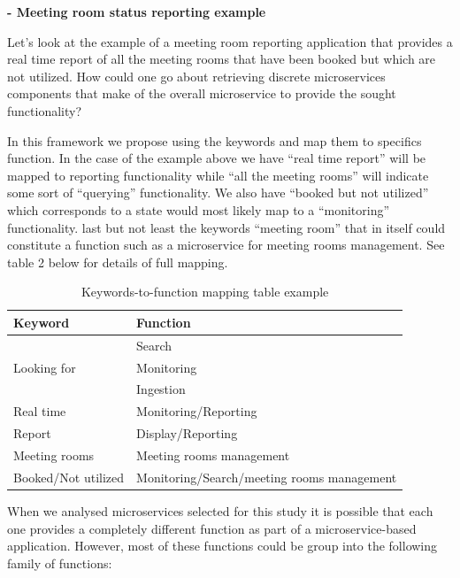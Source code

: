\documentclass{article}
\begin{document}
\textbf{- Meeting room status reporting example}

Let's look at the example of a meeting room reporting application that provides a real time report of all the meeting rooms that have been booked but which are not utilized. How could one go about retrieving discrete microservices components that make of the overall microservice to provide the sought functionality?

In this framework we propose using the keywords and map them to specifics function. In the case of the example above we have “real time report” will be mapped to reporting functionality while “all the meeting rooms” will indicate some sort of “querying” functionality. We also have “booked but not utilized” which corresponds to a state would most likely map to a “monitoring” functionality. last but not least the keywords “meeting room” that in itself could constitute a function such as a microservice for meeting rooms management. See table 2 below for details of full mapping.


\begin{table}[h!]
  \begin{center}
  \small
    \begin{tabular}{|l|l|} %
    \hline
    \textbf{Keyword} & \textbf{Function}\\
    \hline
      \multirow{3}{*}{Looking for} & Search\\
      & Monitoring\\ 
      & Ingestion\\
      \hline
      Real time & Monitoring/Reporting\\
      \hline
      Report & Display/Reporting\\
      \hline
      Meeting rooms & Meeting rooms management\\
      \hline
      Booked/Not utilized & Monitoring/Search/meeting rooms management\\
      \hline
    \end{tabular}
        \caption{Keywords-to-function mapping table example}
    \label{tab:Table 2}
  \end{center}
\end{table}


When we analysed microservices selected for this study it is possible that each one provides a completely different function as part of a microservice-based application. However, most of these functions could be group into the following family of functions:
\end{document}
